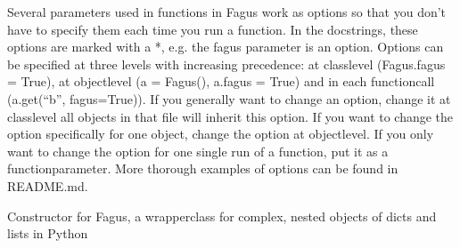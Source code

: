 \documentclass[a4paper,10pt,english]{sphinxmanual}
\begin{document}
\begin{fulllineitems}
\sphinxAtStartPar
Several parameters used in functions in Fagus work as options so that you don’t have to specify them each time you
run a function. In the docstrings, these options are marked with a *, e.g. the fagus parameter is an option.
Options can be specified at three levels with increasing precedence: at class\sphinxhyphen{}level (Fagus.fagus = True), at
object\sphinxhyphen{}level (a = Fagus(), a.fagus = True) and in each function\sphinxhyphen{}call (a.get(“b”, fagus=True)). If you generally want
to change an option, change it at class\sphinxhyphen{}level \sphinxhyphen{} all objects in that file will inherit this option. If you want to
change the option specifically for one object, change the option at object\sphinxhyphen{}level. If you only want to change the
option for one single run of a function, put it as a function\sphinxhyphen{}parameter. More thorough examples of options can be
found in README.md.

\begin{fulllineitems}
\label{\detokenize{fagus.fagus:fagus.fagus.Fagus.__init__}}
\pysigstartsignatures
{}
\pysigstopsignatures
\sphinxAtStartPar
Constructor for Fagus, a wrapper\sphinxhyphen{}class for complex, nested objects of dicts and lists in Python


\end{fulllineitems}
\end{fulllineitems}
\end{document}
